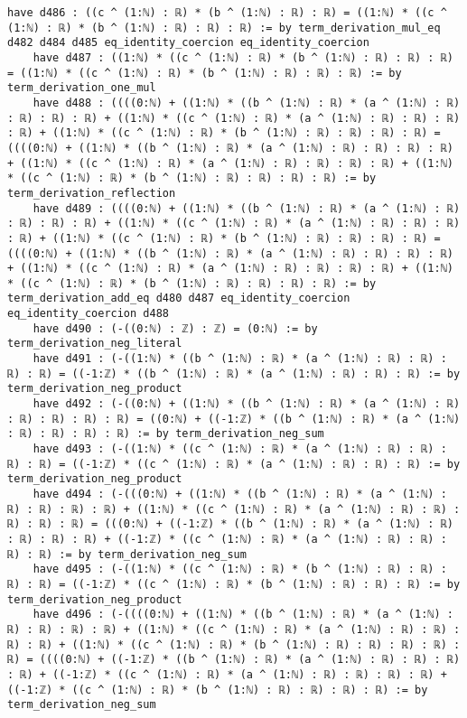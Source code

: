 \documentclass{article}
\begin{document}
\begin{tcolorbox}[colback=white!10, width=\linewidth]
\begin{lstlisting}[language=Lean4]
    have d486 : ((c ^ (1:ℕ) : ℝ) * (b ^ (1:ℕ) : ℝ) : ℝ) = ((1:ℕ) * ((c ^ (1:ℕ) : ℝ) * (b ^ (1:ℕ) : ℝ) : ℝ) : ℝ) := by term_derivation_mul_eq d482 d484 d485 eq_identity_coercion eq_identity_coercion
    have d487 : ((1:ℕ) * ((c ^ (1:ℕ) : ℝ) * (b ^ (1:ℕ) : ℝ) : ℝ) : ℝ) = ((1:ℕ) * ((c ^ (1:ℕ) : ℝ) * (b ^ (1:ℕ) : ℝ) : ℝ) : ℝ) := by term_derivation_one_mul
    have d488 : ((((0:ℕ) + ((1:ℕ) * ((b ^ (1:ℕ) : ℝ) * (a ^ (1:ℕ) : ℝ) : ℝ) : ℝ) : ℝ) + ((1:ℕ) * ((c ^ (1:ℕ) : ℝ) * (a ^ (1:ℕ) : ℝ) : ℝ) : ℝ) : ℝ) + ((1:ℕ) * ((c ^ (1:ℕ) : ℝ) * (b ^ (1:ℕ) : ℝ) : ℝ) : ℝ) : ℝ) = ((((0:ℕ) + ((1:ℕ) * ((b ^ (1:ℕ) : ℝ) * (a ^ (1:ℕ) : ℝ) : ℝ) : ℝ) : ℝ) + ((1:ℕ) * ((c ^ (1:ℕ) : ℝ) * (a ^ (1:ℕ) : ℝ) : ℝ) : ℝ) : ℝ) + ((1:ℕ) * ((c ^ (1:ℕ) : ℝ) * (b ^ (1:ℕ) : ℝ) : ℝ) : ℝ) : ℝ) := by term_derivation_reflection
    have d489 : ((((0:ℕ) + ((1:ℕ) * ((b ^ (1:ℕ) : ℝ) * (a ^ (1:ℕ) : ℝ) : ℝ) : ℝ) : ℝ) + ((1:ℕ) * ((c ^ (1:ℕ) : ℝ) * (a ^ (1:ℕ) : ℝ) : ℝ) : ℝ) : ℝ) + ((1:ℕ) * ((c ^ (1:ℕ) : ℝ) * (b ^ (1:ℕ) : ℝ) : ℝ) : ℝ) : ℝ) = ((((0:ℕ) + ((1:ℕ) * ((b ^ (1:ℕ) : ℝ) * (a ^ (1:ℕ) : ℝ) : ℝ) : ℝ) : ℝ) + ((1:ℕ) * ((c ^ (1:ℕ) : ℝ) * (a ^ (1:ℕ) : ℝ) : ℝ) : ℝ) : ℝ) + ((1:ℕ) * ((c ^ (1:ℕ) : ℝ) * (b ^ (1:ℕ) : ℝ) : ℝ) : ℝ) : ℝ) := by term_derivation_add_eq d480 d487 eq_identity_coercion eq_identity_coercion d488
    have d490 : (-((0:ℕ) : ℤ) : ℤ) = (0:ℕ) := by term_derivation_neg_literal
    have d491 : (-((1:ℕ) * ((b ^ (1:ℕ) : ℝ) * (a ^ (1:ℕ) : ℝ) : ℝ) : ℝ) : ℝ) = ((-1:ℤ) * ((b ^ (1:ℕ) : ℝ) * (a ^ (1:ℕ) : ℝ) : ℝ) : ℝ) := by term_derivation_neg_product
    have d492 : (-((0:ℕ) + ((1:ℕ) * ((b ^ (1:ℕ) : ℝ) * (a ^ (1:ℕ) : ℝ) : ℝ) : ℝ) : ℝ) : ℝ) = ((0:ℕ) + ((-1:ℤ) * ((b ^ (1:ℕ) : ℝ) * (a ^ (1:ℕ) : ℝ) : ℝ) : ℝ) : ℝ) := by term_derivation_neg_sum
    have d493 : (-((1:ℕ) * ((c ^ (1:ℕ) : ℝ) * (a ^ (1:ℕ) : ℝ) : ℝ) : ℝ) : ℝ) = ((-1:ℤ) * ((c ^ (1:ℕ) : ℝ) * (a ^ (1:ℕ) : ℝ) : ℝ) : ℝ) := by term_derivation_neg_product
    have d494 : (-(((0:ℕ) + ((1:ℕ) * ((b ^ (1:ℕ) : ℝ) * (a ^ (1:ℕ) : ℝ) : ℝ) : ℝ) : ℝ) + ((1:ℕ) * ((c ^ (1:ℕ) : ℝ) * (a ^ (1:ℕ) : ℝ) : ℝ) : ℝ) : ℝ) : ℝ) = (((0:ℕ) + ((-1:ℤ) * ((b ^ (1:ℕ) : ℝ) * (a ^ (1:ℕ) : ℝ) : ℝ) : ℝ) : ℝ) + ((-1:ℤ) * ((c ^ (1:ℕ) : ℝ) * (a ^ (1:ℕ) : ℝ) : ℝ) : ℝ) : ℝ) := by term_derivation_neg_sum
    have d495 : (-((1:ℕ) * ((c ^ (1:ℕ) : ℝ) * (b ^ (1:ℕ) : ℝ) : ℝ) : ℝ) : ℝ) = ((-1:ℤ) * ((c ^ (1:ℕ) : ℝ) * (b ^ (1:ℕ) : ℝ) : ℝ) : ℝ) := by term_derivation_neg_product
    have d496 : (-((((0:ℕ) + ((1:ℕ) * ((b ^ (1:ℕ) : ℝ) * (a ^ (1:ℕ) : ℝ) : ℝ) : ℝ) : ℝ) + ((1:ℕ) * ((c ^ (1:ℕ) : ℝ) * (a ^ (1:ℕ) : ℝ) : ℝ) : ℝ) : ℝ) + ((1:ℕ) * ((c ^ (1:ℕ) : ℝ) * (b ^ (1:ℕ) : ℝ) : ℝ) : ℝ) : ℝ) : ℝ) = ((((0:ℕ) + ((-1:ℤ) * ((b ^ (1:ℕ) : ℝ) * (a ^ (1:ℕ) : ℝ) : ℝ) : ℝ) : ℝ) + ((-1:ℤ) * ((c ^ (1:ℕ) : ℝ) * (a ^ (1:ℕ) : ℝ) : ℝ) : ℝ) : ℝ) + ((-1:ℤ) * ((c ^ (1:ℕ) : ℝ) * (b ^ (1:ℕ) : ℝ) : ℝ) : ℝ) : ℝ) := by term_derivation_neg_sum

\end{lstlisting}
\end{tcolorbox}
\end{document}
